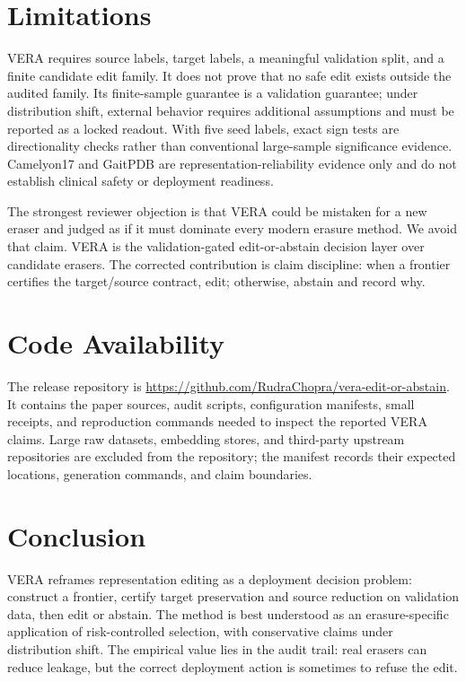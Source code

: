 \documentclass[letterpaper]{article}
\begin{document}
\section{Limitations}

VERA requires source labels, target labels, a meaningful validation split, and
a finite candidate edit family. It does not prove that no safe edit exists
outside the audited family. Its finite-sample guarantee is a validation
guarantee; under distribution shift, external behavior requires additional
assumptions and must be reported as a locked readout. With five seed labels,
exact sign tests are directionality checks rather than conventional
large-sample significance evidence. Camelyon17 and GaitPDB are
representation-reliability evidence only and do not establish clinical safety
or deployment readiness.

The strongest reviewer objection is that VERA could be mistaken for a new
eraser and judged as if it must dominate every modern erasure method. We avoid
that claim. VERA is the validation-gated edit-or-abstain decision layer over
candidate erasers. The corrected contribution is claim discipline: when a
frontier certifies the target/source contract, edit; otherwise, abstain and
record why.

\section{Code Availability}

The release repository is
\url{https://github.com/RudraChopra/vera-edit-or-abstain}. It contains the
paper sources, audit scripts, configuration manifests, small receipts, and
reproduction commands needed to inspect the reported VERA claims. Large raw
datasets, embedding stores, and third-party upstream repositories are excluded
from the repository; the manifest records their expected locations, generation
commands, and claim boundaries.

\section{Conclusion}

VERA reframes representation editing as a deployment decision problem:
construct a frontier, certify target preservation and source reduction on
validation data, then edit or abstain. The method is best understood as an
erasure-specific application of risk-controlled selection, with conservative
claims under distribution shift. The empirical value lies in the audit trail:
real erasers can reduce leakage, but the correct deployment action is sometimes
to refuse the edit.
\end{document}

